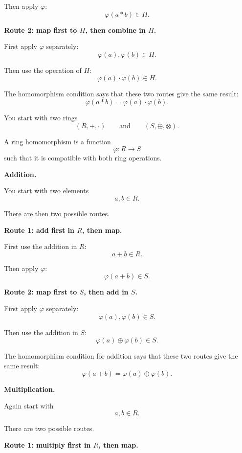\documentclass[12pt]{article}
\begin{document}
	Then apply \(\varphi\):
	\[
	\varphi(a\ast b)\in H.
	\]
	
	\medskip
	
	\textbf{Route 2: map first to \(H\), then combine in \(H\).}
	
	First apply \(\varphi\) separately:
	\[
	\varphi(a),\varphi(b)\in H.
	\]
	
	Then use the operation of \(H\):
	\[
	\varphi(a)\cdot\varphi(b)\in H.
	\]
	
	\medskip
	
	The homomorphism condition says that these two routes give the same result:
	\[
	\varphi(a\ast b)=\varphi(a)\cdot\varphi(b).
	\]
	
	You start with two rings
	\[
	(R,+,\cdot)\qquad\text{and}\qquad(S,\oplus,\otimes).
	\]
	
	A ring homomorphism is a function
	\[
	\varphi:R\to S
	\]
	such that it is compatible with both ring operations.
	
	\medskip
	
	\textbf{Addition.}
	
	You start with two elements
	\[
	a,b\in R.
	\]
	
	There are then two possible routes.
	
	\medskip
	
	\textbf{Route 1: add first in \(R\), then map.}
	
	First use the addition in \(R\):
	\[
	a+b\in R.
	\]
	
	Then apply \(\varphi\):
	\[
	\varphi(a+b)\in S.
	\]
	
	\medskip
	
	\textbf{Route 2: map first to \(S\), then add in \(S\).}
	
	First apply \(\varphi\) separately:
	\[
	\varphi(a),\varphi(b)\in S.
	\]
	
	Then use the addition in \(S\):
	\[
	\varphi(a)\oplus\varphi(b)\in S.
	\]
	
	\medskip
	
	The homomorphism condition for addition says that these two routes give the same result:
	\[
	\varphi(a+b)=\varphi(a)\oplus\varphi(b).
	\]
	
	\bigskip
	
	\textbf{Multiplication.}
	
	Again start with
	\[
	a,b\in R.
	\]
	
	There are two possible routes.
	
	\medskip
	
	\textbf{Route 1: multiply first in \(R\), then map.}
	
\end{document}
